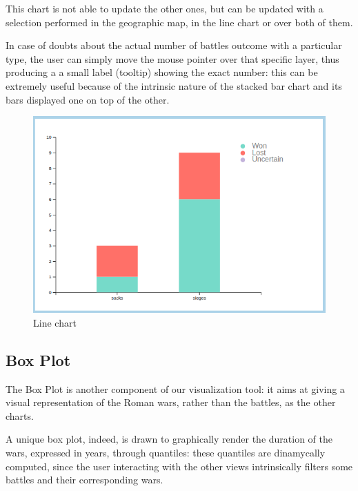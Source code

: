 This chart is not able to update the other ones, but can be updated with a selection performed in the geographic map, in the line chart or over both of them.

In case of doubts about the actual number of battles outcome with a particular type, the user can simply move the mouse pointer over that specific layer, thus producing a a small label (tooltip) showing the exact number: this can be extremely useful because of the intrinsic nature of the stacked bar chart and its bars displayed one on top of the other.
\begin{figure}[h]
\centering
\includegraphics[scale=0.30]{./images/stacked_bar_chart.png}
\caption{Line chart}
\end{figure}

\subsection{Box Plot}
The Box Plot is another component of our visualization tool: it aims at giving a visual representation of the Roman wars, rather than the battles, as the other charts.

A unique box plot, indeed, is drawn to graphically render the duration of the wars, expressed in years, through quantiles: these quantiles are dinamycally computed, since the user interacting with the other views intrinsically filters some battles and their corresponding wars.


